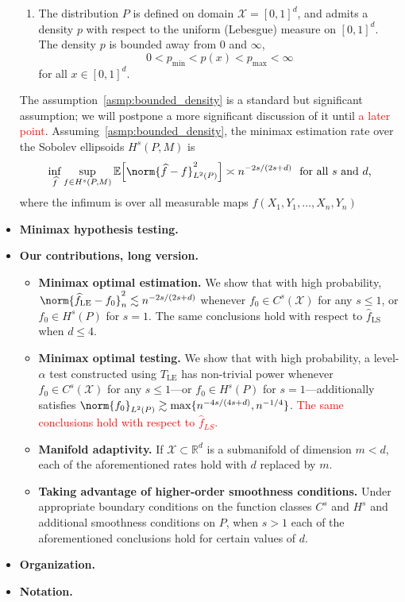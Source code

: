 \documentclass{article}
\newcommand{\Reals}{\mathbb{R}}
\newcommand{\1}{\mathbf{1}}
\newcommand{\Rd}{\Reals^d}
\newcommand{\Xset}{\mathcal{X}}
\newcommand{\Leb}{L}
\newcommand{\mc}[1]{\mathcal{#1}}
\newcommand{\Ebb}{\mathbb{E}}
\newcommand{\wh}[1]{\widehat{#1}}
\newcommand{\LE}{\mathrm{LE}}
\newcommand{\LS}{\mathrm{LS}}
\theoremstyle{alden}
\theoremstyle{aldenthm}
\theoremstyle{definition}
\theoremstyle{remark}
\begin{document}
\begin{itemize}
	\begin{enumerate}[(P1)]
		\item 
		\label{asmp:bounded_density}
		The distribution $P$ is defined on domain $\Xset = [0,1]^d$, and admits a density $p$ with respect to the uniform (Lebesgue) measure on $[0,1]^d$. The density $p$ is bounded away from $0$ and $\infty$,
		\begin{equation*}
		0 < p_{\min} < p(x) < p_{\max} < \infty
		\end{equation*}
		for all $x \in [0,1]^d$.
	\end{enumerate}
	The assumption~\ref{asmp:bounded_density} is a standard but significant assumption; we will postpone a more significant discussion of it until \textcolor{red}{a later point}. Assuming~\ref{asmp:bounded_density}, the minimax estimation rate over the Sobolev ellipsoids $H^{s}(P,M)$ is
	\begin{equation*}
	\inf_{\wh{f}} \sup_{f \in H^s(P,M)} \Ebb\Bigl[\norm{\wh{f} - f}_{L^2(P)}^2\Bigr] \asymp n^{-2s/(2s + d)}~~\textrm{for all $s$ and $d$,}
	\end{equation*}
	where the infimum is over all measurable maps $\wh{f}(X_1,Y_1,\ldots,X_n,Y_n)$
	\item \textbf{Minimax hypothesis testing.}
	\item \textbf{Our contributions, long version.}
	\begin{itemize}
		\item \textbf{Minimax optimal estimation.}
		We show that with high probability,  $\norm{\wh{f}_{\LE} - f_0}_{n}^2 \lesssim n^{-2s/(2s + d)}$ whenever $f_0 \in C^s(\mc{X})$ for any $s \leq 1$, or $f_0 \in H^s(P)$ for $s = 1$. The same conclusions hold with respect to $\wh{f}_{\LS}$ when $d \leq 4$. 
		\item \textbf{Minimax optimal testing.}
		We show that with high probability, a level-$\alpha$ test constructed using $T_{\LE}$ has non-trivial power whenever $f_0 \in C^s(\mc{X})$ for any $s \leq 1$---or $f_0 \in H^s(P)$ for $s = 1$---additionally satisfies $\norm{f_0}_{\Leb^2(P)} \gtrsim \max\{n^{-4s/(4s + d)},n^{-1/4}\}$. \textcolor{red}{The same conclusions hold with respect to $\wh{f}_{LS}$.}
		\item \textbf{Manifold adaptivity.}
		If $\mc{X} \subset \Rd$ is a submanifold of dimension $m < d$, each of the aforementioned rates hold with $d$ replaced by $m$.
		\item \textbf{Taking advantage of higher-order smoothness conditions.} Under appropriate boundary conditions on the function classes $C^s$ and $H^s$ and additional smoothness conditions on $P$, when $s > 1$  each of the aforementioned conclusions hold for certain values of $d$.
	\end{itemize}
	\item \textbf{Organization.}
	\item \textbf{Notation.}
\end{itemize}
\end{document}

